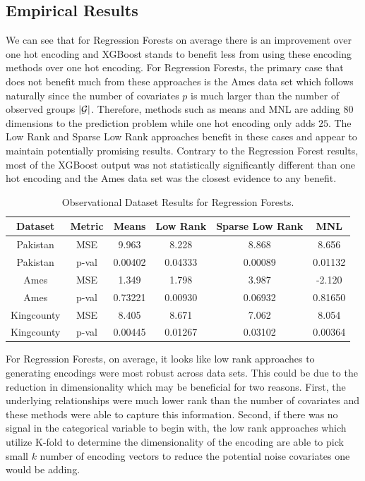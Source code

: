 \documentclass{article}
\theoremstyle{plain}
\theoremstyle{definition}
\theoremstyle{remark}
\begin{document}

\subsection{Empirical Results}


We can see that for Regression Forests on average there is an improvement over one hot encoding and XGBoost stands to benefit less from using these encoding methods over one hot encoding. For Regression Forests, the primary case that does not benefit much from these approaches is the Ames data set which follows naturally since the number of covariates $p$ is much larger than the number of observed groups $|\mathcal{G}|$. Therefore, methods such as means and MNL are adding $80$ dimensions to the prediction problem while one hot encoding only adds $25$. The Low Rank and Sparse Low Rank approaches benefit in these cases and appear to maintain potentially promising results. Contrary to the Regression Forest results, most of the XGBoost output was not statistically significantly different than one hot encoding and the Ames data set was the closest evidence to any benefit.

\begin{table}[H]
	\centering
	\begin{tabular}{|c|c|c|c|c|c|}
		\hline
		Dataset& Metric & Means & Low Rank & Sparse Low Rank & MNL  \\
		\hline
		Pakistan & MSE & 9.963 &8.228 &8.868 &8.656 \\
		Pakistan & p-val& 0.00402 & 0.04333&0.00089 &0.01132 \\
		\hline
		Ames & MSE & 1.349 & 1.798&3.987 &-2.120\\
		Ames & p-val&0.73221&0.00930&0.06932&0.81650 \\
		\hline
		Kingcounty & MSE &8.405&8.671&7.062& 8.054\\
		Kingcounty & p-val&0.00445&0.01267&0.03102&0.00364 \\
		\hline
	\end{tabular}
	\caption{Observational Dataset Results for Regression Forests.}
	\label{tab:observational_rf}
\end{table}
For Regression Forests, on average, it looks like low rank approaches to generating encodings were most robust across data sets. This could be due to the reduction in dimensionality which may be beneficial  for two reasons. First, the underlying relationships were much lower rank than the number of covariates and these methods were able to capture this information. Second, if there was no signal in the categorical variable to begin with, the low rank approaches which utilize K-fold to determine the dimensionality of the encoding are able to pick small $k$ number of encoding vectors to reduce the potential noise covariates one would be adding.
\end{document}

